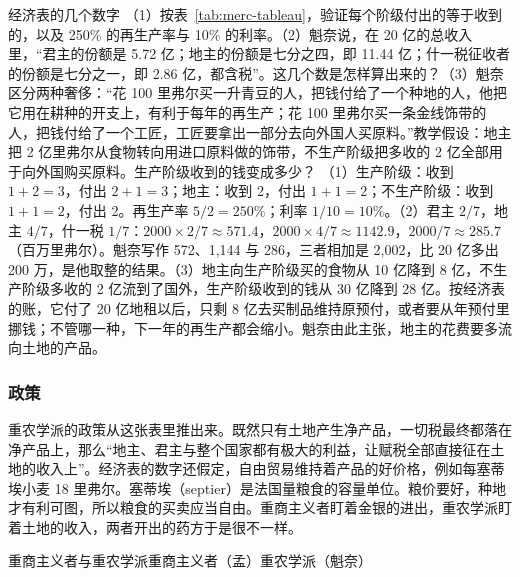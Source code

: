\begin{example}{经济表的几个数字}\label{ex:merc-tableau}
（1）按表~\ref{tab:merc-tableau}，验证每个阶级付出的等于收到的，以及 250\% 的再生产率与 10\% 的利率。（2）魁奈说，在 20 亿的总收入里，“君主的份额是 5.72 亿；地主的份额是七分之四，即 11.44 亿；什一税征收者的份额是七分之一，即 2.86 亿，都含税”\cite{quesnay1766}。这几个数是怎样算出来的？（3）魁奈区分两种奢侈：“花 100 里弗尔买一升青豆的人，把钱付给了一个种地的人，他把它用在耕种的开支上，有利于每年的再生产；花 100 里弗尔买一条金线饰带的人，把钱付给了一个工匠，工匠要拿出一部分去向外国人买原料。”\cite{quesnay1766}教学假设：地主把 2 亿里弗尔从食物转向用进口原料做的饰带，不生产阶级把多收的 2 亿全部用于向外国购买原料。生产阶级收到的钱变成多少？
\solution （1）生产阶级：收到 $1+2=3$，付出 $2+1=3$；地主：收到 2，付出 $1+1=2$；不生产阶级：收到 $1+1=2$，付出 2。再生产率 $5/2=250\%$；利率 $1/10=10\%$。（2）君主 $2/7$，地主 $4/7$，什一税 $1/7$：$2000\times2/7\approx571.4$，$2000\times4/7\approx1142.9$，$2000/7\approx285.7$（百万里弗尔）。魁奈写作 572、1,144 与 286，三者相加是 2,002，比 20 亿多出 200 万，是他取整的结果。（3）地主向生产阶级买的食物从 10 亿降到 8 亿，不生产阶级多收的 2 亿流到了国外，生产阶级收到的钱从 30 亿降到 28 亿。按经济表的账，它付了 20 亿地租以后，只剩 8 亿去买制品维持原预付，或者要从年预付里挪钱；不管哪一种，下一年的再生产都会缩小。魁奈由此主张，地主的花费要多流向土地的产品。
\end{example}

\subsubsection{政策}
重农学派的政策从这张表里推出来。既然只有土地产生净产品，一切税最终都落在净产品上，那么“地主、君主与整个国家都有极大的利益，让赋税全部直接征在土地的收入上”\cite{quesnay1766}。经济表的数字还假定，自由贸易维持着产品的好价格，例如每塞蒂埃小麦 18 里弗尔\cite{quesnay1766}。塞蒂埃（septier）是法国量粮食的容量单位。粮价要好，种地才有利可图，所以粮食的买卖应当自由。重商主义者盯着金银的进出，重农学派盯着土地的收入，两者开出的药方于是很不一样。

\begin{compare}{重商主义者与重农学派}{重商主义者（孟）}{重农学派（魁奈）}
\end{compare}

